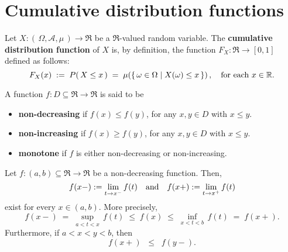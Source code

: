 

\section{Cumulative distribution functions}
\setcounter{theorem}{0}
\setcounter{equation}{0}

\begin{definition}\quad
Let $X : \left(\,\Omega,\mathcal{A},\mu\,\right) \longrightarrow \Re$ be a $\Re$-valued random variable.
The \textbf{cumulative distribution function} of $X$ is, by definition, the function
$F_{X} : \Re \longrightarrow [0,1]$ defined as follows:
\begin{equation*}
F_{X}(x) \; := \; P\!\left(\,X \leq x\,\right) \; = \; \mu\!\left(\left\{\,\omega \in \Omega \;\vert\; X(\omega) \leq x \,\right\}\right),
\quad
\textnormal{for each $x \in \Re$}.
\end{equation*}
\end{definition}

\begin{definition}\quad
A function $f : D \subseteq \Re \longrightarrow \Re$ is said to be 
\begin{itemize}
\item	\textbf{non-decreasing} if $f(x) \leq f(y)$, for any $x, y \in D$ with $x \leq y$.
\item	\textbf{non-increasing} if $f(x) \geq f(y)$, for any $x, y \in D$ with $x \leq y$.
\item	\textbf{monotone} if $f$ is either non-decreasing or non-increasing.
\end{itemize}
\end{definition}

\begin{theorem}
\label{ThmMonotoneFunctions}
\mbox{}\vskip 0.2cm
\noindent
Let $f : (a,b) \subseteq \Re \longrightarrow \Re$ be a non-decreasing function.
Then,
\begin{equation*}
f(x-) := \lim_{t \rightarrow x^{-}} f(t)
\quad\textnormal{and}\quad
f(x+) := \lim_{t \rightarrow x^{+}} f(t)
\end{equation*}
exist for every $x \in (a,b)$.
More precisely,
\begin{equation*}
f(x-)
\; = \; \sup_{a < t < x}\,f(t)
\;\leq\; f(x)
\;\leq\; \inf_{x < t < b}\,f(t)
\;=\; f(x+).
\end{equation*}
Furthermore, if $a < x < y < b$, then
\begin{equation*}
f(x+) \;\;\leq\;\; f(y-).
\end{equation*}
\end{theorem}

